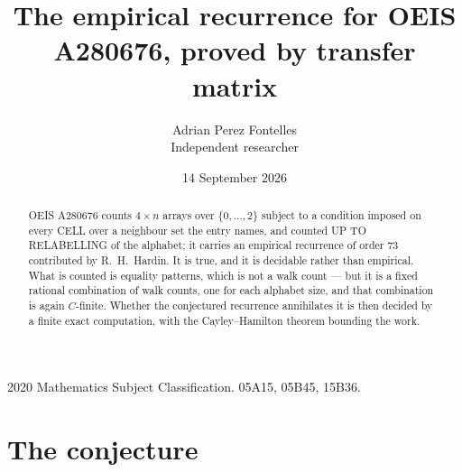 \documentclass[11pt,a4paper]{article}
\title{The empirical recurrence for OEIS A280676, proved by transfer matrix}
\author{Adrian Perez Fontelles\\ \small Independent researcher}
\date{14 September 2026}
\theoremstyle{plain}
\theoremstyle{definition}
\begin{document}
\maketitle

\begin{abstract}
OEIS A280676 counts $4\times n$ arrays over $\{0,\dots,2\}$ subject to a condition imposed on
every CELL over a neighbour set the entry names, and counted UP TO RELABELLING of the
alphabet; it carries an empirical recurrence of order $73$ contributed by
R.~H.~Hardin. It is true, and it is decidable rather than empirical. What is counted is
equality patterns, which is not a walk count --- but it is a fixed rational combination of
walk counts, one for each alphabet size, and that combination is again $C$-finite. Whether the
conjectured recurrence annihilates it is then decided by a finite exact computation, with the
Cayley--Hamilton theorem bounding the work.
\end{abstract}

\noindent\small 2020 Mathematics Subject Classification. 05A15, 05B45, 15B36.\normalsize

\section{The conjecture}
\end{document}
